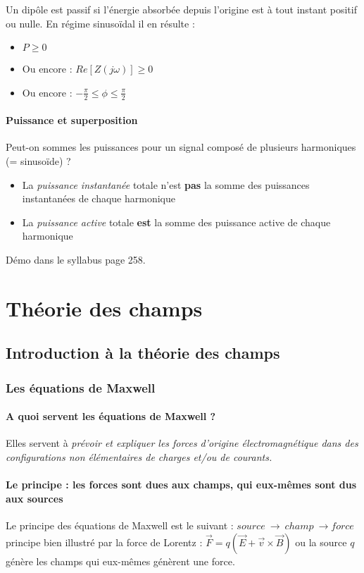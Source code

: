 \documentclass[11pt, a4paper, openany]{book}
\begin{document}
		Un dipôle est passif si l'énergie absorbée depuis l'origine est à tout instant positif ou  nulle. En régime sinusoïdal il en résulte :
		\begin{itemize}
			\item $P \geq 0$
			\item Ou encore : $Re[Z(j\omega)] \geq 0$
			\item Ou encore : $-\frac{\pi}{2} \leq \phi \leq \frac{\pi}{2}$
		\end{itemize}
		
		\setcounter{subsection}{6}
		\subsection{Puissance et superposition}
		Peut-on sommes les puissances pour un signal composé de plusieurs harmoniques (= sinusoïde) ? 
		\begin{itemize}
			\item La \textit{puissance instantanée} totale n'est \textbf{pas} la somme des puissances instantanées de chaque harmonique
			\item La \textit{puissance active} totale \textbf{est} la somme des puissance active de chaque harmonique
		\end{itemize}
		Démo dans le syllabus page 258.
		
		
		\part{Théorie des champs}
		\setcounter{chapter}{0}
		\chapter{Introduction à la théorie des champs}
		\section{Les équations de Maxwell}
		\subsection{A quoi servent les équations de Maxwell ?}
		Elles servent à \textit{prévoir et expliquer les forces d'origine électromagnétique dans des configurations non élémentaires de charges et/ou de courants.}
		
		\subsection{Le principe : les forces sont dues aux champs, qui eux-mêmes sont dus aux sources}
		Le principe des équations de Maxwell est le suivant : $source\ \rightarrow\ champ\ \rightarrow force$ principe bien illustré par la force de Lorentz : $\vec{F} = q(\vec{E} + \vec{v}\times\vec{B})$ ou la source $q$ génère les champs qui eux-mêmes génèrent une force.\\
		
\end{document}
